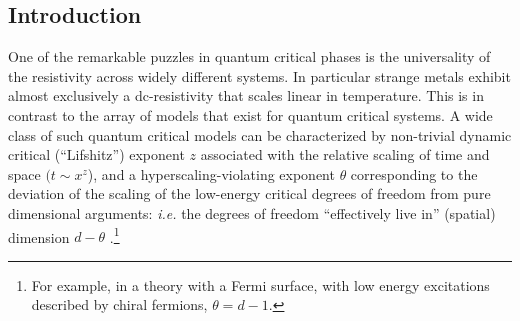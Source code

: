 \documentclass[10pt, oneside]{book}
\begin{document}
\begin{doublespace}
\section{Introduction}
One of the remarkable puzzles in quantum critical phases is the universality of the resistivity across widely different systems. In particular strange metals exhibit almost exclusively a dc-resistivity that scales linear in temperature. This is in contrast to the array of models that exist for quantum critical systems. A wide class of such quantum critical models %
can be characterized by
non-trivial dynamic critical (``Lifshitz'') exponent $z$ associated with the relative scaling of time and space $(t\sim x^z$), and a hyperscaling-violating exponent $\theta$ corresponding to the deviation of the scaling of the low-energy critical degrees of freedom from pure dimensional arguments: {\em i.e.\/} the degrees of freedom ``effectively live in'' (spatial) dimension $d-\theta$ \cite{ssbook}.\footnote{For example, in a theory with a Fermi surface, with low energy excitations described by chiral fermions, $\theta=d-1$.} %
%
%


\end{doublespace}
\end{document}
